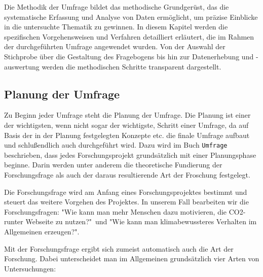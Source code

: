 
Die Methodik der Umfrage bildet das methodische Grundgerüst, das die systematische Erfassung und Analyse von Daten ermöglicht, um präzise Einblicke in die untersuchte Thematik zu gewinnen. In diesem Kapitel werden die spezifischen Vorgehensweisen und Verfahren detailliert erläutert, die im Rahmen der durchgeführten Umfrage angewendet wurden.
Von der Auswahl der Stichprobe über die Gestaltung des Fragebogens bis hin zur Datenerhebung und -auswertung werden die methodischen Schritte transparent dargestellt.

\subsection{Planung der Umfrage}
Zu Beginn jeder Umfrage steht die Planung der Umfrage.
Die Planung ist einer der wichtigsten, wenn nicht sogar der wichtigste, Schritt einer Umfrage, da auf Basis der in der Planung festgelegten Konzepte etc.
die finale Umfrage aufbaut und schlußendlich auch durchgeführt wird.
Dazu wird im Buch \texttt{Umfrage} beschrieben, dass jedes Forschungsprojekt grundsätzlich mit einer Planungsphase beginne.
Darin werden unter anderem die theoretische Fundierung der Forschungsfrage als auch der daraus resultierende Art der Froschung festgelegt.\cite{umfrage:2011}

Die Forschungsfrage wird am Anfang eines Forschungsprojektes bestimmt und steuert das weitere Vorgehen des Projektes. \cite{umfrage:2011}
In unserem Fall bearbeiten wir die Forschungsfragen: "Wie kann man mehr Menschen dazu motivieren, die CO2-runter Webseite zu nutzen?"\ und "Wie kann man klimabewussteres Verhalten im Allgemeinen erzeugen?".

Mit der Forschungsfrage ergibt sich zumeist automatisch auch die Art der Forschung.
Dabei unterscheidet man im Allgemeinen grundsätzlich vier Arten von Untersuchungen:

